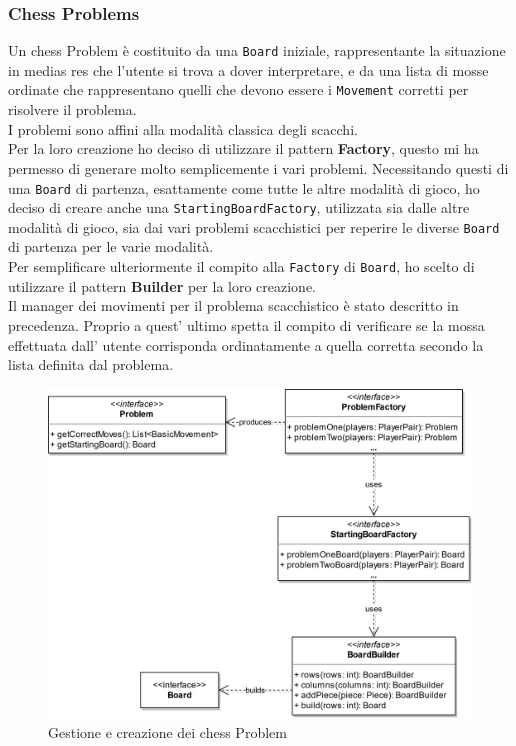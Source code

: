 \documentclass[a4paper,12pt]{report}
\begin{document}
\subsubsection*{Chess Problems}

Un chess Problem è costituito da una \texttt{Board} iniziale, rappresentante la situazione in medias res che l'utente si trova a dover interpretare, e da una lista di mosse ordinate che rappresentano quelli che devono essere i \texttt{Movement} corretti per risolvere il problema.\\
I problemi sono affini alla modalità classica degli scacchi.\\
Per la loro creazione ho deciso di utilizzare il pattern \textbf{Factory}, questo mi ha permesso di generare molto semplicemente i vari problemi.
Necessitando questi di una \texttt{Board} di partenza, esattamente come tutte le altre modalità di gioco, ho deciso di creare anche una \texttt{StartingBoardFactory}, utilizzata sia dalle altre modalità di gioco, sia dai vari problemi scacchistici per reperire le diverse \texttt{Board} di partenza per le varie modalità.
\\
Per semplificare ulteriormente il compito alla \texttt{Factory} di \texttt{Board}, ho scelto di utilizzare il pattern \textbf{Builder} per la loro creazione.\\
Il manager dei movimenti per il problema scacchistico è stato descritto in precedenza. Proprio a quest' ultimo spetta il compito di verificare se la mossa effettuata dall' utente corrisponda ordinatamente a quella corretta secondo la lista definita dal problema.
\begin{figure}[H]
\centering{}
\includegraphics[scale=0.8]{img/Stefano/ChessProblem}
\caption{Gestione e creazione dei chess Problem}
\label{img:ChessProblem}
\end{figure}
\end{document}
